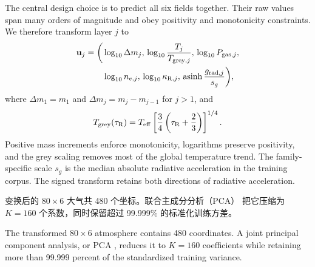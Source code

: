 \begin{EN}
The central design choice is to predict all six fields together. Their raw
values span many orders of magnitude and obey positivity and monotonicity
constraints. We therefore transform layer $j$ to
\begin{equation}
\begin{aligned}
\mathbf{u}_j=\bigg(&
\log_{10}\Delta m_j,\,
\log_{10}\frac{T_j}{T_{{\rm grey},j}},\,
\log_{10}P_{{\rm gas},j},\\
&\log_{10}n_{e,j},\,
\log_{10}\kappa_{{\rm R},j},\,
\operatorname{asinh}\frac{g_{{\rm rad},j}}{s_g}
\bigg),
\end{aligned}
\end{equation}
\noindent where $\Delta m_1=m_1$ and
$\Delta m_j=m_j-m_{j-1}$ for $j>1$, and
\begin{equation}
T_{\rm grey}(\tau_{\rm R})=
T_{\rm eff}
\left[\frac{3}{4}\left(\tau_{\rm R}+\frac{2}{3}\right)\right]^{1/4}.
\end{equation}
\noindent Positive mass increments enforce monotonicity, logarithms preserve
positivity, and the grey scaling removes most of the global temperature trend.
The family-specific scale $s_g$ is the median absolute radiative acceleration
in the training corpus. The signed transform retains both directions of
radiative acceleration.
\end{EN}

变换后的 $80\times6$ 大气共 480 个坐标。联合主成分分析（PCA）\citep{JolliffeCadima2016} 把它压缩为 $K=160$ 个系数，同时保留超过 99.999\% 的标准化训练方差。

\begin{EN}
The transformed $80\times6$ atmosphere contains 480 coordinates. A joint
principal component analysis, or PCA \citep{JolliffeCadima2016}, reduces it to
$K=160$ coefficients while retaining more than 99.999 percent of the
standardized training variance.
\end{EN}

